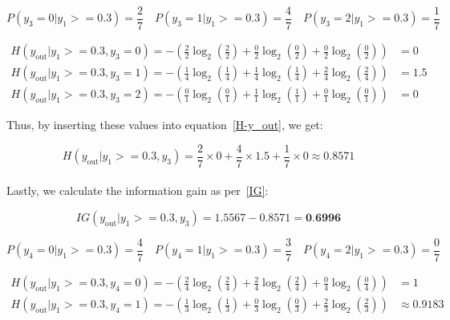\documentclass[12pt]{article}
\begin{document}
\begin{enumerate}[leftmargin=\labelsep]
\begin{equation*}
    P(y_3 = 0|y_1 >= 0.3) = \frac{2}{7} \quad
    P(y_3 = 1|y_1 >= 0.3) = \frac{4}{7} \quad
    P(y_3 = 2|y_1 >= 0.3) = \frac{1}{7} \quad
\end{equation*}

\begin{equation*}
    \begin{aligned}
        H(y_{\text{out}}|y_1 >= 0.3, y_3 = 0) = - \left( \frac{2}{2} \log_2 \left( \frac{2}{2} \right) + \frac{0}{2} \log_2 \left( \frac{0}{2} \right) + \frac{0}{2} \log_2 \left( \frac{0}{2} \right) \right) &= 0 
        \\
        H(y_{\text{out}}|y_1 >= 0.3, y_3 = 1) = - \left( \frac{1}{4} \log_2 \left( \frac{1}{4} \right) + \frac{1}{4} \log_2 \left( \frac{1}{4} \right) + \frac{2}{4} \log_2 \left( \frac{2}{4} \right) \right) &= 1.5
        \\
        H(y_{\text{out}}|y_1 >= 0.3, y_3 = 2) = - \left( \frac{0}{1} \log_2 \left( \frac{0}{1} \right) + \frac{1}{1} \log_2 \left( \frac{1}{1} \right) + \frac{0}{1} \log_2 \left( \frac{0}{1} \right) \right) &= 0
    \end{aligned}
\end{equation*}

Thus, by inserting these values into equation~\eqref{H-y_out}, we get:

\begin{equation*}
    H(y_{\text{out}}|y_1 >= 0.3, y_3) = \frac{2}{7} \times  0 + \frac{4}{7} \times 1.5 + \frac{1}{7} \times 0 \approx 0.8571 
\end{equation*}
\\
Lastly, we calculate the information gain as per~\eqref{IG}:

\begin{equation*}
    IG(y_{\text{out}} | y_1 >= 0.3, y_3) = 1.5567 - 0.8571 = \textbf{0.6996}
\end{equation*}

\begin{equation*}
    P(y_4 = 0|y_1 >= 0.3) = \frac{4}{7} \quad
    P(y_4 = 1|y_1 >= 0.3) = \frac{3}{7} \quad
    P(y_4 = 2|y_1 >= 0.3) = \frac{0}{7} \quad
\end{equation*}

\begin{equation*}
    \begin{aligned}
        H(y_{\text{out}}|y_1 >= 0.3, y_4 = 0) = - \left( \frac{2}{4} \log_2 \left( \frac{2}{4} \right) + \frac{2}{4} \log_2 \left( \frac{2}{4} \right) + \frac{0}{4} \log_2 \left( \frac{0}{4} \right) \right) &= 1 
        \\
        H(y_{\text{out}}|y_1 >= 0.3, y_4 = 1) = - \left( \frac{1}{3} \log_2 \left( \frac{1}{3} \right) + \frac{0}{3} \log_2 \left( \frac{0}{3} \right) + \frac{2}{3} \log_2 \left( \frac{2}{3} \right) \right) &\approx 0.9183
        \\
    \end{aligned}
\end{equation*}


\end{enumerate}
\end{document}
